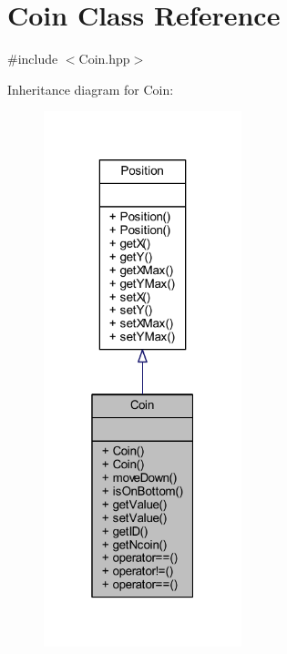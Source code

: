 \hypertarget{class_coin}{}\section{Coin Class Reference}
\label{class_coin}


{\ttfamily \#include $<$Coin.\+hpp$>$}



Inheritance diagram for Coin\+:
\nopagebreak
\begin{figure}[H]
\begin{center}
\leavevmode
\includegraphics[width=163pt]{class_coin__inherit__graph}
\end{center}
\end{figure}



